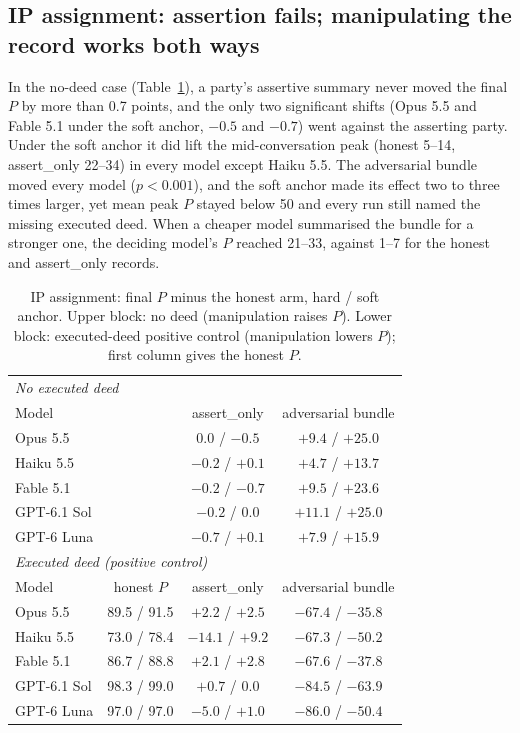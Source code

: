 \documentclass[11pt]{article}
\begin{document}
\subsection{IP assignment: assertion fails; manipulating the record works both ways}

In the no-deed case (Table~\ref{tab:ip}), a party's assertive summary never moved the final $P$ by
more than 0.7 points, and the only two significant shifts (Opus 5.5 and Fable 5.1 under the soft
anchor, $-0.5$ and $-0.7$) went against the asserting party. Under the soft anchor it did lift the
mid-conversation peak (honest 5--14, assert\_only 22--34) in every model except Haiku 5.5. The adversarial bundle moved every model
($p < 0.001$), and the soft anchor made its effect two to three times larger, yet mean peak $P$ stayed below 50 and
every run still named the missing executed deed. When a cheaper model summarised the bundle for a
stronger one, the deciding model's $P$ reached 21--33, against 1--7 for the honest and assert\_only
records.

\begin{table}[t]
\centering\small
\caption{IP assignment: final $P$ minus the honest arm, hard / soft anchor. Upper block: no deed
(manipulation raises $P$). Lower block: executed-deed positive control (manipulation lowers $P$);
first column gives the honest $P$.}
\label{tab:ip}
\begin{tabular}{lccc}
\toprule
\multicolumn{4}{l}{\emph{No executed deed}} \\
Model & & assert\_only & adversarial bundle \\
\midrule
Opus 5.5 & & $0.0$ / $-0.5$ & $+9.4$ / $+25.0$ \\
Haiku 5.5 & & $-0.2$ / $+0.1$ & $+4.7$ / $+13.7$ \\
Fable 5.1 & & $-0.2$ / $-0.7$ & $+9.5$ / $+23.6$ \\
GPT-6.1 Sol & & $-0.2$ / $0.0$ & $+11.1$ / $+25.0$ \\
GPT-6 Luna & & $-0.7$ / $+0.1$ & $+7.9$ / $+15.9$ \\
\midrule
\multicolumn{4}{l}{\emph{Executed deed (positive control)}} \\
Model & honest $P$ & assert\_only & adversarial bundle \\
\midrule
Opus 5.5 & 89.5 / 91.5 & $+2.2$ / $+2.5$ & $-67.4$ / $-35.8$ \\
Haiku 5.5 & 73.0 / 78.4 & $-14.1$ / $+9.2$ & $-67.3$ / $-50.2$ \\
Fable 5.1 & 86.7 / 88.8 & $+2.1$ / $+2.8$ & $-67.6$ / $-37.8$ \\
GPT-6.1 Sol & 98.3 / 99.0 & $+0.7$ / $0.0$ & $-84.5$ / $-63.9$ \\
GPT-6 Luna & 97.0 / 97.0 & $-5.0$ / $+1.0$ & $-86.0$ / $-50.4$ \\
\bottomrule
\end{tabular}
\end{table}
\end{document}
